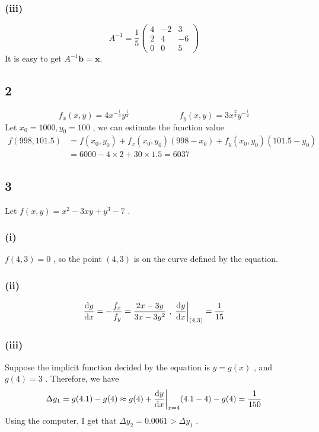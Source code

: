 \documentclass[UTF8]{ctexart}
\begin{document}
\subsubsection*{(iii)}
\[
    A^{-1} = \frac{1}{5} \left(
    \begin{array}{ccc}
        4 & -2 & 3 \\
        2 & 4 & -6 \\
        0 & 0 & 5
    \end{array}
    \right)
\]
It is easy to get $A^{-1} \bm{b} = \bm{x}$.

\subsection*{2}
\[
    f_x(x, y) = 4 x^{-\frac{1}{3}} y^{\frac{1}{2}}
    \qquad\qquad\qquad
    f_y(x, y) = 3 x^{\frac{2}{3}} y^{-\frac{1}{2}}
\]
Let $x_0 = 1000, y_0 = 100$ , we can estimate the function value
\begin{align*}
    f(998, 101.5)
    &= f(x_0, y_0) + f_x(x_0, y_0) (998 - x_0) + f_y(x_0, y_0) (101.5 - y_0) \\
    &= 6000 - 4 \times 2 + 30 \times 1.5
    = 6037
\end{align*}

\subsection*{3}
Let $f(x, y) = x^2 - 3xy + y^3 - 7$ .
\subsubsection*{(i)}
$f(4, 3) = 0$ , so the point $(4,3)$ is on the curve defined by the equation.
\subsubsection*{(ii)}
\begin{gather*}
    \frac{\dif y}{\dif x} =
    - \frac{f_x}{f_y} =
    \frac{2x - 3y}{3x - 3y^2} \ ,\; 
    \frac{\dif y}{\dif x} \bigg|_{(4, 3)} = \frac{1}{15}
\end{gather*}
\subsubsection*{(iii)}
Suppose the implicit function decided by the equation is $y = g(x)$ , and $g(4) = 3$ . Therefore, we have
\[
    \Delta g_1 = g(4.1) - g(4)
    \approx g(4) + \frac{\dif y}{\dif x} \bigg|_{x = 4} (4.1 - 4) - g(4) = \frac{1}{150}
\]
Using the computer, I get that $\Delta y_2 = 0.0061 > \Delta y_1$ .
\end{document}
